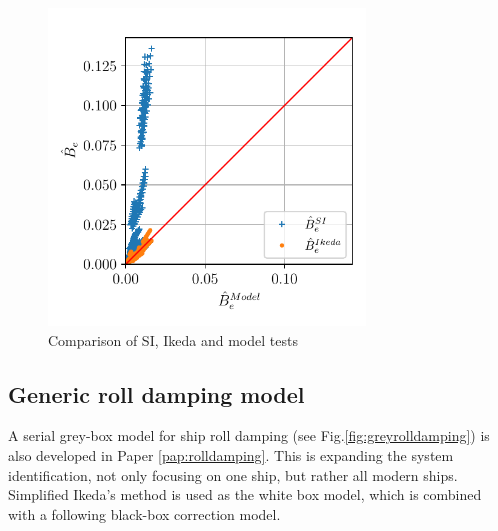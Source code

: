 \begin{figure}[!htb]

    \includegraphics[width=0.75\textwidth]{kappa/images/si_ikeda_model.pdf}
    \caption{Comparison of SI, Ikeda and model tests}
    \label{fig:si_ikeda_model}

\end{figure}





\subsection{Generic roll damping model}
\label{sec:genericrolldampingmodel}
A serial grey-box model for ship roll damping (see Fig.\ref{fig:greyrolldamping}) is also developed in Paper \ref{pap:rolldamping}. 
This is expanding the system identification, not only focusing on one ship, but rather all modern ships. 
Simplified Ikeda's method \cite{kawahara_simple_2011} is used as the white box model, which is combined with a following black-box correction model.

